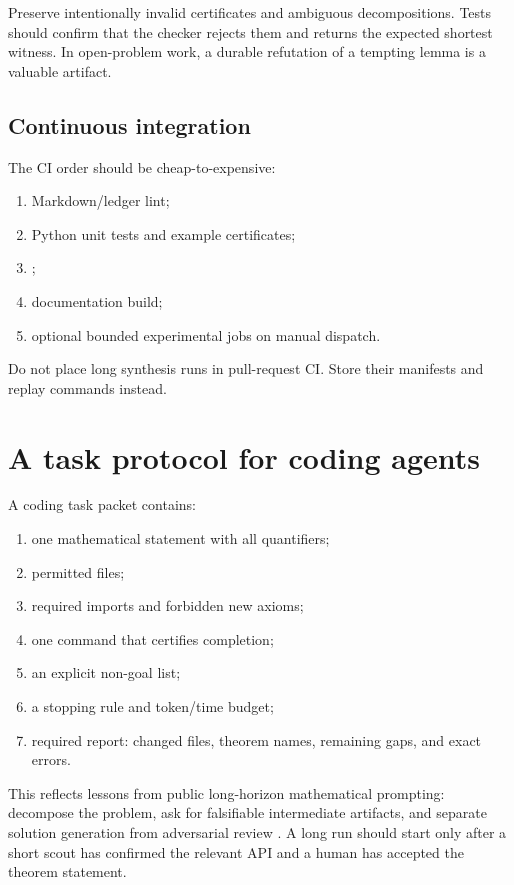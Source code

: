 \documentclass{amsart}
\begin{document}
Preserve intentionally invalid certificates and ambiguous decompositions.  Tests should confirm that the checker rejects them and returns the expected shortest witness.  In open-problem work, a durable refutation of a tempting lemma is a valuable artifact.

\subsection{Continuous integration}

The CI order should be cheap-to-expensive:
\begin{enumerate}
  \item Markdown/ledger lint;
  \item Python unit tests and example certificates;
  \item {};
  \item documentation build;
  \item optional bounded experimental jobs on manual dispatch.
\end{enumerate}
Do not place long synthesis runs in pull-request CI.  Store their manifests and replay commands instead.

\section{A task protocol for coding agents}

A coding task packet contains:
\begin{enumerate}
  \item one mathematical statement with all quantifiers;
  \item permitted files;
  \item required imports and forbidden new axioms;
  \item one command that certifies completion;
  \item an explicit non-goal list;
  \item a stopping rule and token/time budget;
  \item required report: changed files, theorem names, remaining gaps, and exact errors.
\end{enumerate}

This reflects lessons from public long-horizon mathematical prompting: decompose the problem, ask for falsifiable intermediate artifacts, and separate solution generation from adversarial review \cite{openaiUnitDistance2026,jacobianPrompt2026}.  A long run should start only after a short scout has confirmed the relevant API and a human has accepted the theorem statement.
\end{document}
